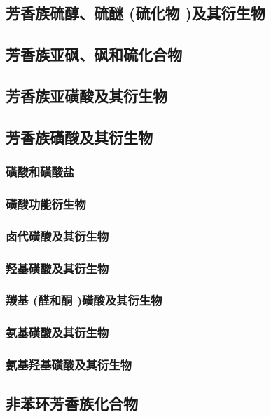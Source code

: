 \documentclass[UTF8]{../03-Chemistry}
\begin{document}
    \subsection{芳香族硫醇、硫醚 (硫化物 )及其衍生物}
    \subsection{芳香族亚砜、砜和硫化合物}
    \subsection{芳香族亚磺酸及其衍生物}
    \subsection{芳香族磺酸及其衍生物}
        \subsubsection{磺酸和磺酸盐}
        \subsubsection{磺酸功能衍生物}
        \subsubsection{卤代磺酸及其衍生物}
        \subsubsection{羟基磺酸及其衍生物}
        \subsubsection{羰基 (醛和酮 )磺酸及其衍生物}
        \subsubsection{氨基磺酸及其衍生物}
        \subsubsection{氨基羟基磺酸及其衍生物}
    \subsection{非苯环芳香族化合物}
\end{document}
